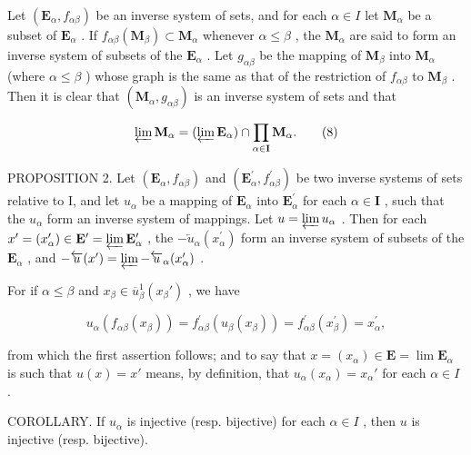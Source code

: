 Let \((\mathbf{E}_{\alpha}, f_{\alpha \beta})\) be an inverse system of sets, and for each \(\alpha \in I\) let \(\mathbf{M}_{\alpha}\) be a subset of \(\mathbf{E}_{\alpha}\) . If \(f_{\alpha \beta}(\mathbf{M}_{\beta}) \subset \mathbf{M}_{\alpha}\) whenever \(\alpha \leqslant \beta\) , the \(\mathbf{M}_{\alpha}\) are said to form an inverse system of subsets of the \(\mathbf{E}_{\alpha}\) . Let \(g_{\alpha \beta}\) be the mapping of \(\mathbf{M}_{\beta}\) into \(\mathbf{M}_{\alpha}\) (where \(\alpha \leqslant \beta\) ) whose graph is the same as that of the restriction of \(f_{\alpha \beta}\) to \(\mathbf{M}_{\beta}\) . Then it is clear that \((\mathbf{M}_{\alpha}, g_{\alpha \beta})\) is an inverse system of sets and that

\[
\varprojlim \mathbf {M} _ {\alpha} = (\varprojlim \mathbf {E} _ {\alpha}) \cap \prod_ {\alpha \in \mathbf {I}} \mathbf {M} _ {\alpha}.\tag{8}
\]

PROPOSITION 2. Let \((\mathbf{E}_{\alpha}, f_{\alpha \beta})\) and \((\mathbf{E}_{\alpha}^{\prime}, f_{\alpha \beta}^{\prime})\) be two inverse systems of sets relative to I, and let \(u_{\alpha}\) be a mapping of \(\mathbf{E}_{\alpha}\) into \(\mathbf{E}_{\alpha}^{\prime}\) for each \(\alpha \in \mathbf{I}\) , such that the \(u_{\alpha}\) form an inverse system of mappings. Let \(u = \varprojlim u_{\alpha}\) . Then for each \(x^{\prime} = (x_{\alpha}^{\prime}) \in \mathbf{E}^{\prime} = \varprojlim \mathbf{E}_{\alpha}^{\prime}\) , the \(-\overleftarrow{u}_{\alpha}(x_{\alpha}^{\prime})\) form an inverse system of subsets of the \(\mathbf{E}_{\alpha}\) , and \(-\overleftarrow{u}(x^{\prime}) = \varprojlim -\overleftarrow{u}_{\alpha}(x_{\alpha}^{\prime})\) .

For if \(\alpha \leqslant \beta\) and \(x_{\beta} \in \overline{u}_{\beta}^{1}(x_{\beta}')\) , we have

\[
u _ {\alpha} (f _ {\alpha \beta} (x _ {\beta})) = f _ {\alpha \beta} ^ {\prime} (u _ {\beta} (x _ {\beta})) = f _ {\alpha \beta} ^ {\prime} (x _ {\beta} ^ {\prime}) = x _ {\alpha} ^ {\prime},
\]

from which the first assertion follows; and to say that \(x = (x_{\alpha}) \in \mathbf{E} = \lim \mathbf{E}_{\alpha}\) is such that \(u(x) = x'\) means, by definition, that \(u_{\alpha}(x_{\alpha}) = x_{\alpha}'\) for each \(\alpha \in I\) .

COROLLARY. If \(u_{\alpha}\) is injective (resp. bijective) for each \(\alpha \in I\) , then \(u\) is injective (resp. bijective).

